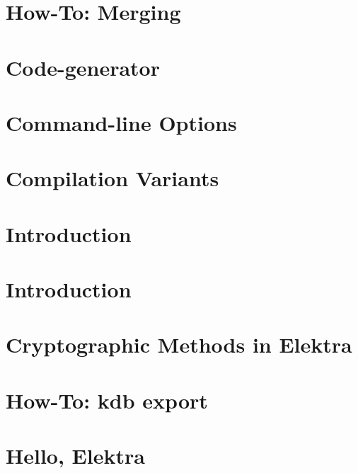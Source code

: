 \let\mypdfximage\pdfximage\def\pdfximage{\immediate\mypdfximage}\documentclass[twoside]{book}
\newcommand{\+}{\discretionary{\mbox{\scriptsize$\hookleftarrow$}}{}{}}
\begin{document}
\chapter{How-\/\+To\+: Merging}
\label{doc_tutorials_cmerge_md}

\chapter{Code-\/generator}
\label{doc_tutorials_code-generator_md}

\chapter{Command-\/line Options}
\label{doc_tutorials_command-line-options_md}

\chapter{Compilation Variants}
\label{doc_tutorials_compilation-variants_md}

\chapter{Introduction}
\label{doc_tutorials_contributing-clion_md}

\chapter{Introduction}
\label{doc_tutorials_contributing-windows_md}

\chapter{Cryptographic Methods in Elektra}
\label{doc_tutorials_crypto_md}

\chapter{How-\/\+To\+: kdb export}
\label{doc_tutorials_export_md}

\chapter{Hello, Elektra}
\label{doc_tutorials_hello-elektra_md}

\end{document}
